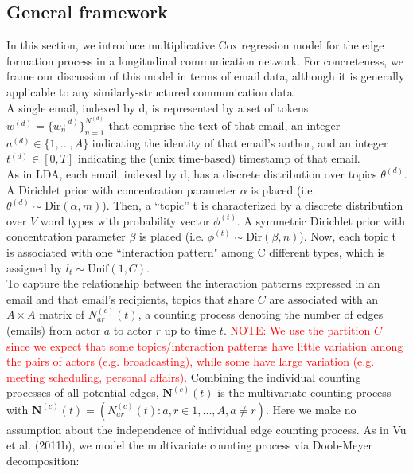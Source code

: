 \documentclass[a4paper]{article}
\begin{document}
\subsection{General framework}
In this section, we introduce multiplicative Cox regression model for the edge formation process in a longitudinal communication network. For concreteness, we frame our discussion of this model in terms of email data, although it is generally applicable to any similarly-structured communication data.\\ \newline A single email, indexed by d, is represented by a set of tokens $w^{(d)} = \{w^{(d)}_n \}_{n=1}^{N^{(d)}}$ that comprise the
text of that email, an integer $a^{(d)} \in \{1,...,A\}$ indicating the identity of that email’s author, and an integer $t^{(d)} \in [0, T]$ indicating the (unix time-based) timestamp of that email. \\ \newline
As in LDA, each email, indexed by d, has a discrete distribution over topics $\theta^{(d)}$. A Dirichlet prior
with concentration parameter $\alpha$ is placed (i.e. $\theta^{(d)}\sim \mbox{Dir}(\alpha, m)$). Then, a “topic” t is characterized by a discrete distribution over $V$ word types with probability vector $\phi^{(t)}$. A symmetric Dirichlet prior with concentration parameter $\beta$ is placed (i.e. $\phi^{(t)} \sim \mbox{Dir}(\beta, n)$). Now, each topic t is associated with one ``interaction pattern" among C different types, which is assigned by $l_t \sim \mbox{Unif}(1, C)$. \\ \newline
To capture the relationship between the interaction patterns expressed in an email and that email’s recipients, topics that share $C$ are associated with an $A\times A$ matrix of $N^{(c)}_{ar}(t)$, a counting process denoting the number of edges (emails) from actor $a$ to actor $r$ up to time $t$. \textcolor{red}{NOTE: We use the partition $C$ since we expect that some topics/interaction patterns have little variation among the pairs of actors (e.g. broadcasting), while some have large variation (e.g. meeting scheduling, personal affairs).} Combining the individual counting processes of all potential edges,  $\mathbf{N}^{(c)}(t)$ is the multivariate counting process with $\mathbf{N}^{(c)}(t)=(N^{(c)}_{ar}(t): a, r \in {1, ..., A}, a \neq r)$. Here we make no assumption about the independence of individual edge counting process. As in Vu et al. (2011b), we model the multivariate counting process via Doob-Meyer decomposition:
\end{document}
